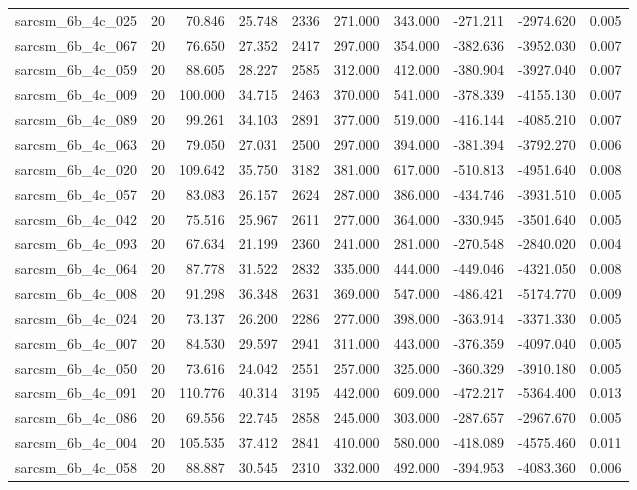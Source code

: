 \begin{tabular}{lrrrrrrrrr}
sarcsm\_6b\_4c\_025 & 20 & 70.846 & 25.748 & 2336 & 271.000 & 343.000 & -271.211 & -2974.620 & 0.005 \\
sarcsm\_6b\_4c\_067 & 20 & 76.650 & 27.352 & 2417 & 297.000 & 354.000 & -382.636 & -3952.030 & 0.007 \\
sarcsm\_6b\_4c\_059 & 20 & 88.605 & 28.227 & 2585 & 312.000 & 412.000 & -380.904 & -3927.040 & 0.007 \\
sarcsm\_6b\_4c\_009 & 20 & 100.000 & 34.715 & 2463 & 370.000 & 541.000 & -378.339 & -4155.130 & 0.007 \\
sarcsm\_6b\_4c\_089 & 20 & 99.261 & 34.103 & 2891 & 377.000 & 519.000 & -416.144 & -4085.210 & 0.007 \\
sarcsm\_6b\_4c\_063 & 20 & 79.050 & 27.031 & 2500 & 297.000 & 394.000 & -381.394 & -3792.270 & 0.006 \\
sarcsm\_6b\_4c\_020 & 20 & 109.642 & 35.750 & 3182 & 381.000 & 617.000 & -510.813 & -4951.640 & 0.008 \\
sarcsm\_6b\_4c\_057 & 20 & 83.083 & 26.157 & 2624 & 287.000 & 386.000 & -434.746 & -3931.510 & 0.005 \\
sarcsm\_6b\_4c\_042 & 20 & 75.516 & 25.967 & 2611 & 277.000 & 364.000 & -330.945 & -3501.640 & 0.005 \\
sarcsm\_6b\_4c\_093 & 20 & 67.634 & 21.199 & 2360 & 241.000 & 281.000 & -270.548 & -2840.020 & 0.004 \\
sarcsm\_6b\_4c\_064 & 20 & 87.778 & 31.522 & 2832 & 335.000 & 444.000 & -449.046 & -4321.050 & 0.008 \\
sarcsm\_6b\_4c\_008 & 20 & 91.298 & 36.348 & 2631 & 369.000 & 547.000 & -486.421 & -5174.770 & 0.009 \\
sarcsm\_6b\_4c\_024 & 20 & 73.137 & 26.200 & 2286 & 277.000 & 398.000 & -363.914 & -3371.330 & 0.005 \\
sarcsm\_6b\_4c\_007 & 20 & 84.530 & 29.597 & 2941 & 311.000 & 443.000 & -376.359 & -4097.040 & 0.005 \\
sarcsm\_6b\_4c\_050 & 20 & 73.616 & 24.042 & 2551 & 257.000 & 325.000 & -360.329 & -3910.180 & 0.005 \\
sarcsm\_6b\_4c\_091 & 20 & 110.776 & 40.314 & 3195 & 442.000 & 609.000 & -472.217 & -5364.400 & 0.013 \\
sarcsm\_6b\_4c\_086 & 20 & 69.556 & 22.745 & 2858 & 245.000 & 303.000 & -287.657 & -2967.670 & 0.005 \\
sarcsm\_6b\_4c\_004 & 20 & 105.535 & 37.412 & 2841 & 410.000 & 580.000 & -418.089 & -4575.460 & 0.011 \\
sarcsm\_6b\_4c\_058 & 20 & 88.887 & 30.545 & 2310 & 332.000 & 492.000 & -394.953 & -4083.360 & 0.006 \\

\end{tabular}
